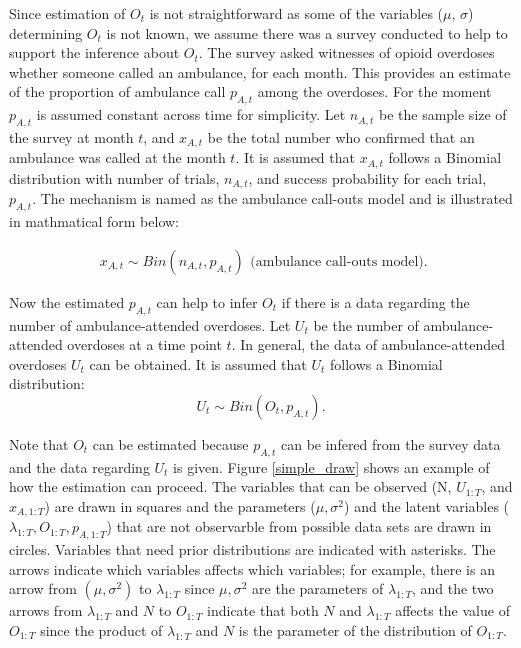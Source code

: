 \documentclass[12pt]{article}
\begin{document}
{ 
Since estimation of $O_t$ is not straightforward as some of the variables ($\mu$, $\sigma$) determining $O_t$ is not known, we assume there was a survey conducted to help to support the inference about  $O_t$. The survey asked witnesses of opioid overdoses whether someone called an ambulance, for each month. This provides an estimate of the proportion of ambulance call $p_{A,t}$ among the overdoses. For the moment $p_{A,t}$ is assumed constant across time for simplicity. Let $n_{A,t}$ be the sample size of the survey at month $t$, and $x_{A,t}$ be the total number who confirmed that an ambulance was called at the month $t$. It is assumed that $x_{A,t}$ follows a Binomial distribution with number of trials, $n_{A,t}$, and  success probability for each trial, $p_{A,t}$. The mechanism is named as the ambulance call-outs model and is illustrated in mathmatical form below:

\begin{equation}
\label{ambulance}
\left.\begin{aligned}
x_{A,t} \sim Bin(n_{A,t},p_{A,t})\end{aligned}\right.
\text{(ambulance call-outs model).}
\end{equation}

Now the estimated $p_{A,t}$ can help to infer $O_t$ if there is a data regarding the number of  ambulance-attended overdoses. Let \(U_t\) be the number of ambulance-attended overdoses at a time point $t$. In general, the data of ambulance-attended overdoses \(U_t\) can be obtained. It is assumed that  \(U_t\) follows a Binomial distribution: 
\begin{equation}
\label{over_amb}
\left.
U_t \sim Bin(O_t, p_{A,t}).
\right.
\end{equation}

Note that $O_t$ can be estimated because $p_{A,t}$ can be infered from the survey data and the data regarding $U_t$ is given. Figure \ref{simple_draw} shows an example of how the estimation can proceed. The variables that can be observed (N, $U_{1:T}$, and $x_{A,1:T}$) are drawn in squares and the parameters ($\mu, \sigma^2$) and the latent variables ($\lambda_{1:T}, O_{1:T}, p_{A,1:T} $) that are not observarble from possible data sets are drawn in circles. Variables that need prior distributions are indicated with asterisks. The arrows indicate which variables affects which variables; for example, there is an arrow from $(\mu, \sigma^2)$ to $\lambda_{1:T}$ since $\mu, \sigma^2$ are the parameters of $\lambda_{1:T}$, and the two arrows from  $\lambda_{1:T}$ and $N$ to $O_{1:T}$ indicate that both $N$ and $\lambda_{1:T}$ affects the value of $O_{1:T}$ since the product of $\lambda_{1:T}$ and $N$ is the parameter of the distribution of $O_{1:T}$.\\

}
\end{document}

